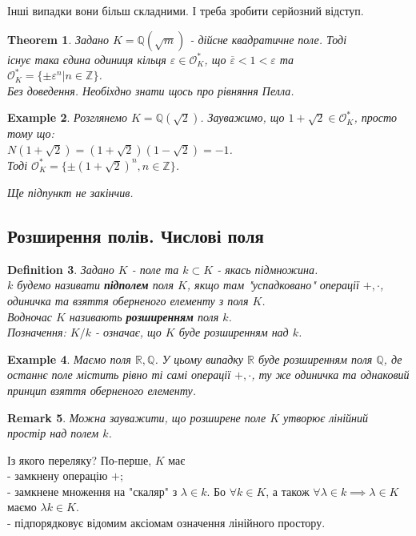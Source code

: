 \documentclass[a4paper, 14pt]{extarticle}
\theoremstyle{theoremdd}
\newtheorem{theorem}{Theorem}[subsection]
\theoremstyle{theoremdd}
\newtheorem{definition}[theorem]{Definition}
\theoremstyle{theoremdd}
\theoremstyle{theoremdd}
\newtheorem{example}[theorem]{Example}
\theoremstyle{theoremdd}
\theoremstyle{theoremdd}
\newtheorem{remark}[theorem]{Remark}
\theoremstyle{theoremdd}
\theoremstyle{theoremdd}
\begin{document}
Інші випадки вони більш складними. І треба зробити серйозний відступ.

\begin{theorem}
Задано $K = \mathbb{Q}(\sqrt{m})$ - дійсне квадратичне поле. Тоді\\
існує така єдина одиниця кільця $\varepsilon \in \mathcal{O}^*_K$, що $\overline{\varepsilon} < 1 < \varepsilon$ та \\
$\mathcal{O}^*_K = \{ \pm \varepsilon^n | n \in \mathbb{Z} \}$.\\
\textit{Без доведення. Необіхдно знати щось про рівняння Пелла.}
\end{theorem}

\begin{example}
Розглянемо $K = \mathbb{Q}(\sqrt{2})$. Зауважимо, що $1+\sqrt{2} \in \mathcal{O}^*_K$, просто тому що:\\
$N(1+\sqrt{2}) = (1+\sqrt{2})(1-\sqrt{2}) = -1$.\\
Тоді $\mathcal{O}^*_K = \{ \pm (1+\sqrt{2})^n, n \in \mathbb{Z} \}$.
\end{example}

\textit{Ще підпункт не закінчив.}

\subsection{Розширення полів. Числові поля}
\begin{definition}
Задано $K$ - поле та $k \subset K$ - якась підмножина.\\
$k$ будемо називати \textbf{підполем} поля $K$, якщо там "успадковано" операції $+,\cdot$, одиничка та взяття оберненого елементу з поля $K$.\\
Водночас $K$ називають \textbf{розширенням} поля $k$.\\
Позначення: $K/k$ - означає, що $K$ буде розширенням над $k$.
\end{definition}

\begin{example}
Маємо поля $\mathbb{R}, \mathbb{Q}$. У цьому випадку $\mathbb{R}$ буде розширенням поля $\mathbb{Q}$, де останнє поле містить рівно ті самі операції $+,\cdot$, ту же одиничка та однаковий принцип взяття оберненого елементу.
\end{example}

\begin{remark}
Можна зауважити, що розширене поле $K$ утворює лінійний простір над полем $k$.
\end{remark}
Із якого переляку? По-перше, $K$ має\\
- замкнену операцію $+$;\\
- замкнене множення на "скаляр" з $\lambda \in k$. Бо $\forall k \in K$, а також $\forall \lambda \in k \implies \lambda \in K$ маємо $\lambda k \in K$.\\
- підпорядковує відомим аксіомам означення лінійного простору.
\end{document}
